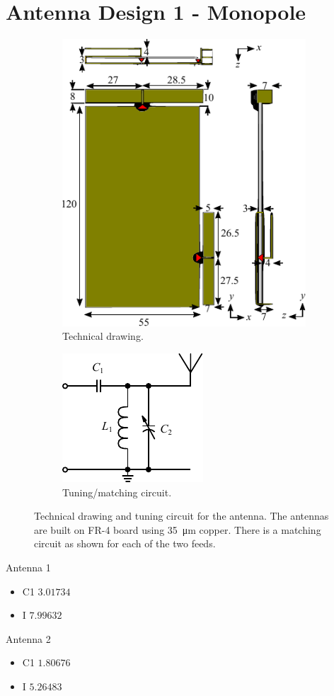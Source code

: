 \section{Antenna Design 1 - Monopole}


\begin{figure}[htbp]
    \begin{subfigure}[b]{0.49\linewidth}
        \centering
        \includegraphics{img/tech_sol/monopole/tech_drawing}
        \caption{Technical drawing.}
        \label{fig:ant1technical}
    \end{subfigure}
    \hfill
    \begin{subfigure}[b]{0.49\linewidth}
        \centering
        \includegraphics{img/tech_sol/schematic_tuning_1}
        \caption{Tuning/matching circuit.}
        \label{fig:ant1schematic}
    \end{subfigure}
    \caption{Technical drawing and tuning circuit for the antenna.  The antennas are built on FR-4 board using \SI{35}{\micro\meter} copper. There is a matching circuit as shown for each of the two feeds.}
    \label{fig:ant2techschem}
\end{figure}

Antenna 1
\begin{itemize}
\item C1 $3.01734$
\item I $7.99632$
\end{itemize}

Antenna 2
\begin{itemize}
\item C1 $1.80676$
\item I $5.26483$
\end{itemize}
